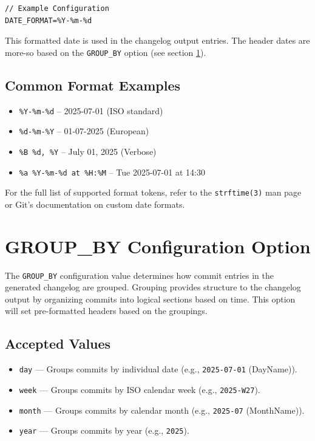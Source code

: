 \begin{lstlisting}[style=cppstyle]
// Example Configuration
DATE_FORMAT=%Y-%m-%d
\end{lstlisting}

This formatted date is used in the changelog output entries. The header dates are more-so based on the \texttt{GROUP\_BY} option (see section \ref{sec:groupby}).

\subsection*{Common Format Examples}
\begin{itemize}
	\item \texttt{\%Y-\%m-\%d} – 2025-07-01 (ISO standard)
	\item \texttt{\%d-\%m-\%Y} – 01-07-2025 (European)
	\item \texttt{\%B \%d, \%Y} – July 01, 2025 (Verbose)
	\item \texttt{\%a \%Y-\%m-\%d at \%H:\%M} – Tue 2025-07-01 at 14:30
\end{itemize}

For the full list of supported format tokens, refer to the \texttt{strftime(3)}\cite{strftime(3)} man page or Git's documentation on custom date formats.










\section{GROUP\_BY Configuration Option}
\label{sec:groupby}

The \texttt{GROUP\_BY} configuration value determines how commit entries in the generated changelog are grouped. Grouping provides structure to the changelog output by organizing commits into logical sections based on time. This option will set pre-formatted headers based on the groupings.

\subsection*{Accepted Values}
\begin{itemize}
	\item \texttt{day} --- Groups commits by individual date (e.g., \texttt{2025-07-01} (DayName)).
	\item \texttt{week} --- Groups commits by ISO calendar week (e.g., \texttt{2025-W27}).
	\item \texttt{month} --- Groups commits by calendar month (e.g., \texttt{2025-07} (MonthName)).
	\item \texttt{year} --- Groups commits by year (e.g., \texttt{2025}).
\end{itemize}

